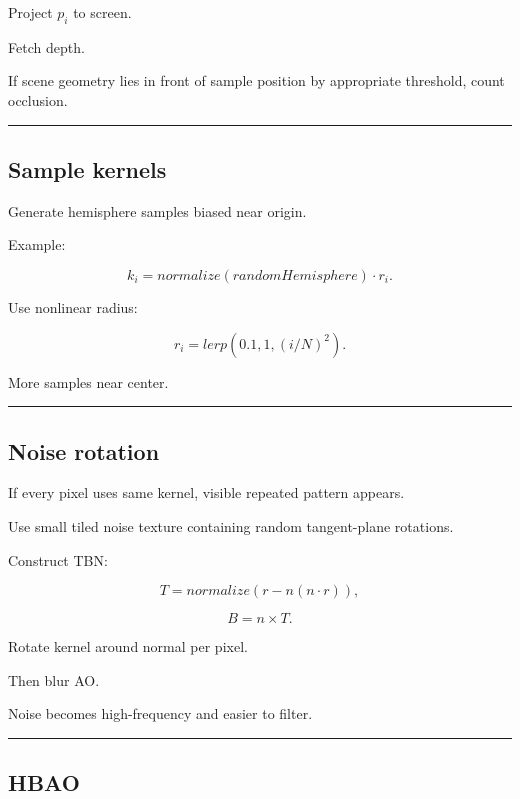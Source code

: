 Project \(p_i\) to screen.

Fetch depth.

If scene geometry lies in front of sample position by appropriate threshold, count occlusion.

\begin{center}\rule{0.5\linewidth}{0.5pt}\end{center}

\subsection{Sample kernels}\label{04-visual-computing-ii-ch040-sample-kernels}

Generate hemisphere samples biased near origin.

Example:

\[
k_i=
normalize(randomHemisphere)
\cdot r_i.
\]

Use nonlinear radius:

\[
r_i=
lerp(
0.1,
1,
(i/N)^2
).
\]

More samples near center.

\begin{center}\rule{0.5\linewidth}{0.5pt}\end{center}

\subsection{Noise rotation}\label{04-visual-computing-ii-ch040-noise-rotation}

If every pixel uses same kernel, visible repeated pattern appears.

Use small tiled noise texture containing random tangent-plane rotations.

Construct TBN:

\[
T=
normalize(
r-n(n\cdot r)
),
\]

\[
B=n\times T.
\]

Rotate kernel around normal per pixel.

Then blur AO.

Noise becomes high-frequency and easier to filter.

\begin{center}\rule{0.5\linewidth}{0.5pt}\end{center}

\subsection{HBAO}\label{04-visual-computing-ii-ch040-hbao}

